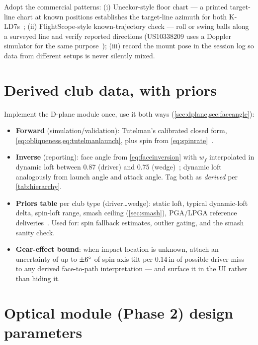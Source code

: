 Adopt the commercial patterns: (i) Uneekor-style floor chart --- a
printed target-line chart at known positions establishes the
target-line azimuth for both K-LD7s~\cite{uneekorcalib}; (ii)
FlightScope-style known-trajectory check --- roll or swing balls along
a surveyed line and verify reported directions
(US10338209 uses a Doppler simulator for the same
purpose~\cite{us10338209}); (iii) record the mount pose in the session
log so data from different setups is never silently mixed.

\section{Derived club data, with priors}
\label{app:priors}

Implement the D-plane module once, use it both ways
(\cref{sec:dplane,sec:faceangle}):
\begin{itemize}\itemsep2pt
\item \textbf{Forward} (simulation/validation): Tutelman's calibrated
closed form, \cref{eq:obliqueness,eq:tutelmanlaunch}, plus spin from
\cref{eq:spinrate}~\cite{tutelman3d}.
\item \textbf{Inverse} (reporting): face angle from
\cref{eq:faceinversion} with $w_f$ interpolated in dynamic loft between
0.87 (driver) and 0.75 (wedge)~\cite{trackmanballflightlaws,tutelman3d};
dynamic loft analogously from launch angle and attack angle. Tag both
as \emph{derived} per \cref{tab:hierarchy}.
\item \textbf{Priors table} per club type (driver\ldots{}wedge): static
loft, typical dynamic-loft delta, spin-loft range, smash ceiling
(\cref{sec:smash}), PGA/LPGA reference deliveries~\cite{trackman40params}.
Used for: spin fallback estimates, outlier gating, and the smash sanity
check.
\item \textbf{Gear-effect bound}: when impact location is unknown,
attach an uncertainty of up to $\pm6\si{\degree}$ of spin-axis tilt per
0.14\,in of possible driver miss~\cite{perfectgolfswing,tutelmangear} to
any derived face-to-path interpretation --- and surface it in the UI
rather than hiding it.
\end{itemize}

\section{Optical module (Phase 2) design parameters}
\label{app:optical}

